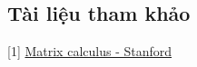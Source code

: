 


\subsection{Tài liệu tham khảo }
[1] \href{https://ccrma.stanford.edu/~dattorro/matrixcalc.pdf}{Matrix calculus - 
Stanford}
